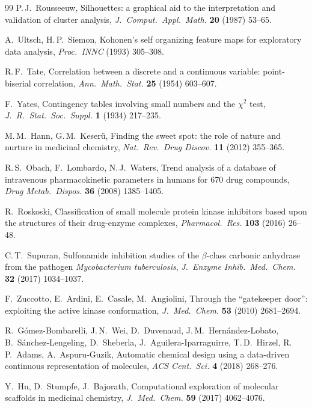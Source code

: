 \documentclass[10pt,a4paper,twocolumn]{article}
\begin{document}
\begin{thebibliography}{99}
P.\,J.~Rousseeuw,
Silhouettes: a graphical aid to the interpretation and validation of cluster analysis,
\textit{J.\ Comput.\ Appl.\ Math.} \textbf{20} (1987) 53--65.

A.~Ultsch, H.\,P.~Siemon,
Kohonen's self organizing feature maps for exploratory data analysis,
\textit{Proc.\ INNC} (1993) 305--308.

R.\,F.~Tate,
Correlation between a discrete and a continuous variable: point-biserial correlation,
\textit{Ann.\ Math.\ Stat.} \textbf{25} (1954) 603--607.

F.~Yates,
Contingency tables involving small numbers and the $\chi^2$ test,
\textit{J.\ R.\ Stat.\ Soc.\ Suppl.} \textbf{1} (1934) 217--235.

M.\,M.~Hann, G.\,M.~Keser{\"u},
Finding the sweet spot: the role of nature and nurture in medicinal chemistry,
\textit{Nat.\ Rev.\ Drug Discov.} \textbf{11} (2012) 355--365.

R.\,S.~Obach, F.~Lombardo, N.\,J.~Waters,
Trend analysis of a database of intravenous pharmacokinetic parameters in humans for 670 drug compounds,
\textit{Drug Metab.\ Dispos.} \textbf{36} (2008) 1385--1405.

R.~Roskoski,
Classification of small molecule protein kinase inhibitors based upon the structures of their drug-enzyme complexes,
\textit{Pharmacol.\ Res.} \textbf{103} (2016) 26--48.

C.\,T.~Supuran,
Sulfonamide inhibition studies of the $\beta$-class carbonic anhydrase from the pathogen \textit{Mycobacterium tuberculosis},
\textit{J.\ Enzyme Inhib.\ Med.\ Chem.} \textbf{32} (2017) 1034--1037.

F.~Zuccotto, E.~Ardini, E.~Casale, M.~Angiolini,
Through the ``gatekeeper door'': exploiting the active kinase conformation,
\textit{J.\ Med.\ Chem.} \textbf{53} (2010) 2681--2694.

R.~G{\'o}mez-Bombarelli, J.\,N.~Wei, D.~Duvenaud, J.\,M.~Hern{\'a}ndez-Lobato, B.~S{\'a}nchez-Lengeling, D.~Sheberla, J.~Aguilera-Iparraguirre, T.\,D.~Hirzel, R.\,P.~Adams, A.~Aspuru-Guzik,
Automatic chemical design using a data-driven continuous representation of molecules,
\textit{ACS Cent.\ Sci.} \textbf{4} (2018) 268--276.

Y.~Hu, D.~Stumpfe, J.~Bajorath,
Computational exploration of molecular scaffolds in medicinal chemistry,
\textit{J.\ Med.\ Chem.} \textbf{59} (2017) 4062--4076.


\end{thebibliography}
\end{document}
